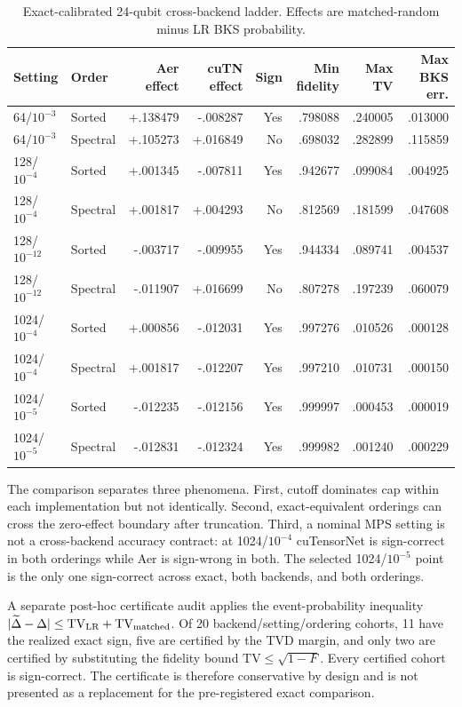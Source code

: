\documentclass[10pt]{article}
\begin{document}
\begin{table}[h]
\centering
\caption{Exact-calibrated 24-qubit cross-backend ladder. Effects are
matched-random minus LR BKS probability.}
\label{tab:crossbackend}
\small
\begin{tabular}{llrrrrrr}
\toprule
Setting & Order & Aer effect & cuTN effect & Sign & Min fidelity & Max TV & Max BKS err. \\
\midrule
64/$10^{-3}$ & Sorted   & +.138479 & -.008287 & Yes & .798088 & .240005 & .013000 \\
64/$10^{-3}$ & Spectral & +.105273 & +.016849 & No  & .698032 & .282899 & .115859 \\
128/$10^{-4}$ & Sorted   & +.001345 & -.007811 & Yes & .942677 & .099084 & .004925 \\
128/$10^{-4}$ & Spectral & +.001817 & +.004293 & No  & .812569 & .181599 & .047608 \\
128/$10^{-12}$ & Sorted   & -.003717 & -.009955 & Yes & .944334 & .089741 & .004537 \\
128/$10^{-12}$ & Spectral & -.011907 & +.016699 & No  & .807278 & .197239 & .060079 \\
1024/$10^{-4}$ & Sorted   & +.000856 & -.012031 & Yes & .997276 & .010526 & .000128 \\
1024/$10^{-4}$ & Spectral & +.001817 & -.012207 & Yes & .997210 & .010731 & .000150 \\
1024/$10^{-5}$ & Sorted   & -.012235 & -.012156 & Yes & .999997 & .000453 & .000019 \\
1024/$10^{-5}$ & Spectral & -.012831 & -.012324 & Yes & .999982 & .001240 & .000229 \\
\bottomrule
\end{tabular}
\end{table}

The comparison separates three phenomena. First, cutoff dominates cap within
each implementation but not identically. Second, exact-equivalent orderings can
cross the zero-effect boundary after truncation. Third, a nominal MPS setting
is not a cross-backend accuracy contract: at 1024/$10^{-4}$ cuTensorNet is
sign-correct in both orderings while Aer is sign-wrong in both. The selected
1024/$10^{-5}$ point is the only one sign-correct across exact, both backends,
and both orderings.

A separate post-hoc certificate audit applies the event-probability inequality
$|\widetilde\Delta-\Delta|\leq\mathrm{TV}_{\rm LR}+\mathrm{TV}_{\rm matched}$.
Of 20 backend/setting/ordering cohorts, 11 have the realized exact sign, five
are certified by the TVD margin, and only two are certified by substituting the
fidelity bound $\mathrm{TV}\leq\sqrt{1-F}$. Every certified cohort is
sign-correct. The certificate is therefore conservative by design and is not
presented as a replacement for the pre-registered exact comparison.
\end{document}
